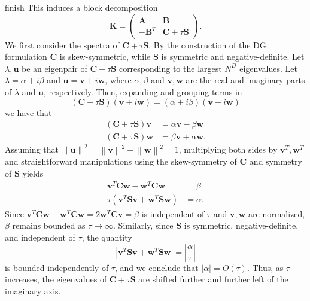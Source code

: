 \documentclass[10pt]{article}
\newcommand{\nor}[1]{\left\| #1 \right\|}
\newcommand{\LRp}[1]{\left( #1 \right)}
\newcommand{\LRb}[1]{\left| #1 \right|}
\newcommand{\note}[1]{{\color{blue}#1}}
\begin{document}
\note{finish}
This induces a block decomposition
\[
\bm{K} = \left(\begin{array}{cc}
\bm{A} & \bm{B}\\
-\bm{B}^T & \bm{C} + \tau \bm{S}
\end{array}\right).
\]
We first consider the spectra of $\bm{C} + \tau\bm{S}$.  By the construction of the DG formulation $\bm{C}$ is skew-symmetric, while $\bm{S}$ is symmetric and negative-definite.  Let $\lambda, \bm{u}$ be an eigenpair of $\bm{C} + \tau{\bm{S}}$ corresponding to the largest $N^D$ eigenvalues. Let $\lambda = \alpha + i\beta$ and $\bm{u} = \bm{v} + i\bm{w}$, where $\alpha,\beta$ and $\bm{v},\bm{w}$ are the real and imaginary parts of $\lambda$ and $\bm{u}$, respectively.  Then, expanding and grouping terms in
\[
(\bm{C}+\tau\bm{S})(\bm{v} + i\bm{w}) = (\alpha + i\beta) (\bm{v} + i\bm{w})
\]
we have that
\begin{align*}
(\bm{C}+\tau\bm{S})\bm{v} &= \alpha\bm{v}-\beta\bm{w}\\
(\bm{C}+\tau\bm{S})\bm{w} &= \beta\bm{v}+\alpha\bm{w}.
\end{align*}
Assuming that $\nor{\bm{u}}^2 = \nor{\bm{v}}^2 + \nor{\bm{w}}^2 = 1$, multiplying both sides by $\bm{v}^T,\bm{w}^T$ and straightforward manipulations %
using the skew-symmetry of $\bm{C}$ and symmetry of $\bm{S}$ yields
\begin{align*}
\bm{v}^T\bm{C}\bm{w} - \bm{w}^T\bm{C}\bm{w} &= \beta\\
\tau\LRp{\bm{v}^T\bm{S}\bm{v} + \bm{w}^T\bm{S}\bm{w}} &= \alpha.
\end{align*}
Since $\bm{v}^T\bm{C}\bm{w} - \bm{w}^T\bm{C}\bm{w}= 2\bm{w}^T\bm{C}\bm{v} = \beta$ is independent of $\tau$ and $\bm{v},\bm{w}$ are normalized, $\beta$ remains bounded as $\tau\rightarrow \infty$.  Similarly, since $\bm{S}$ is symmetric, negative-definite, and independent of $\tau$, the quantity
\[
\LRb{\bm{v}^T\bm{S}\bm{v} + \bm{w}^T\bm{S}\bm{w}} = \LRb{\frac{\alpha}{\tau}}
\]
is bounded independently of $\tau$, and we conclude that $\LRb{\alpha} = O(\tau)$.  Thus, as $\tau$ increases, the eigenvalues of $\bm{C} + \tau\bm{S}$ are shifted further and further left of the imaginary axis.  
\end{document}
